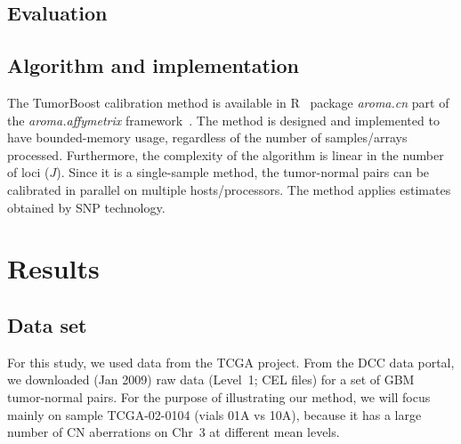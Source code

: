 \documentclass[]{bioinfo}
\newcommand{\pkg}[1]{\textit{#1}\xspace}
\begin{document}
\begin{methods}
\subsection{Evaluation}
\label{secEvaluation}



\subsection{Algorithm and implementation}
The TumorBoost calibration method is available in R~\citep{RDevel_2008} package \pkg{aroma.cn} part of the \pkg{aroma.affymetrix} framework~\citep{BengtssonH_etal_2008b}.  The  method is designed and implemented to have bounded-memory usage, regardless of the number of samples/arrays processed. 
Furthermore, the complexity of the algorithm is linear in the number of loci ($J$).
Since it is a single-sample method, the tumor-normal pairs can be calibrated in parallel on multiple hosts/processors.
The method applies estimates obtained by SNP technology.
\end{methods}


 
\section{Results}
\label{secResults}

\subsection{Data set}
For this study, we used data from the TCGA project.  From the DCC data portal, we downloaded (Jan 2009) raw data (Level~1; CEL files) for a set of GBM tumor-normal pairs.
For the purpose of illustrating our method, we will focus mainly on sample TCGA-02-0104 (vials 01A vs 10A), because it has a large number of CN aberrations on Chr~3 at different mean levels.
\end{document}
